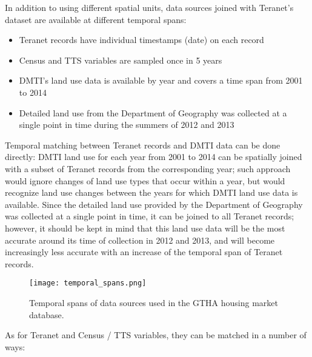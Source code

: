 In addition to using different spatial units, data sources joined with Teranet's dataset are available at different temporal spans:
\begin{itemize}
    \item Teranet records have individual timestamps (date) on each record
    \item Census and TTS variables are sampled once in 5 years
    \item DMTI's land use data is available by year and covers a time span from 2001 to 2014
    \item Detailed land use from the Department of Geography was collected at a single point in time during the summers of 2012 and 2013
\end{itemize}

Temporal matching between Teranet records and DMTI data can be done directly: DMTI land use for each year from 2001 to 2014 can be spatially joined with a subset of Teranet records from the corresponding year;
such approach would ignore changes of land use types that occur within a year, but would recognize land use changes between the years for which DMTI land use data is available.
Since the detailed land use provided by the Department of Geography was collected at a single point in time, it can be joined to all Teranet records;
however, it should be kept in mind that this land use data will be the most accurate around its time of collection in 2012 and 2013, and will become increasingly less accurate with an increase of the temporal span of Teranet records.

\begin{figure}[hbt!]
    \centering
    \texttt{[image: temporal\_spans.png]}
    \caption{Temporal spans of data sources used in the GTHA housing market database.}
    \label{fig:temporal_spans}
\end{figure}

\vspace{5mm}

As for Teranet and Census / TTS variables, they can be matched in a number of ways:

